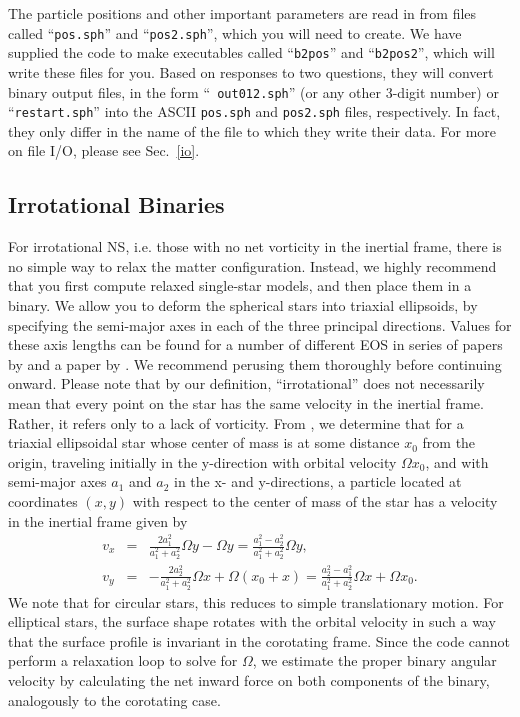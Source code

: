 The particle positions and other important parameters are read in from
files called ``{\tt pos.sph}'' and ``{\tt pos2.sph}'', 
which you will need to create.  We
have supplied the code to make executables called ``{\tt b2pos}'' and
``{\tt b2pos2}'',
which will write these files for you.  Based on responses to two
questions, they will convert binary output files, in the form ``{\tt
out012.sph}'' (or any other 3-digit number) or ``{\tt restart.sph}'' 
into the ASCII {\tt pos.sph} and {\tt pos2.sph} files, respectively.
In fact, they only differ in the name of the file to which they write
their data.  For more on file I/O, please see Sec.~\ref{io}.  

\subsection{Irrotational Binaries}
\label{in:2i}
For irrotational NS, i.e. those with no net vorticity in the inertial
frame, there is no simple way to relax the matter
configuration. Instead, we highly recommend that you first compute
relaxed single-star models, and then place them in a binary.  We allow
you to deform the spherical stars into triaxial ellipsoids, by
specifying the semi-major axes in each of the three principal
directions.  Values for these axis lengths can be found for a number
of different EOS in series of papers by \citet{LRS1,LRS2,LRS4,LRS3,LRS5} 
and a paper by \citet{LomRS2}.  
We recommend perusing them thoroughly before continuing
onward.  Please note that by our
definition, ``irrotational'' does not necessarily
mean that every point on the
star has the same velocity in the inertial frame.  Rather, it refers
only to a lack of vorticity.  From \citet{LomRS2}, we determine that for a
triaxial ellipsoidal star whose center of mass is
at some distance $x_0$ from the origin, traveling initially in
the y-direction with orbital velocity $\Omega x_0$, 
and with semi-major axes $a_1$ and $a_2$ in the x- and
y-directions, a particle located at coordinates $(x,y)$ with
respect to the center of mass of the star has a velocity in the
inertial frame given by
\begin{eqnarray}
v_x&=&\frac{2a_1^2}{a_1^2+a_2^2}\Omega y-\Omega y=
\frac{a_1^2-a_2^2}{a_1^2+a_2^2}\Omega y,\nonumber\\
v_y&=&-\frac{2a_2^2}{a_1^2+a_2^2}\Omega x+\Omega(x_0+x)=
\frac{a_2^2-a_1^2}{a_1^2+a_2^2}\Omega x+\Omega x_0.
\end{eqnarray}
We note that for circular stars, this reduces to simple translationary
motion.  For elliptical stars, the surface shape rotates with the
orbital velocity in such a way that the surface profile is invariant
in the corotating frame. Since the code cannot perform a relaxation
loop to solve for $\Omega$, we estimate the 
proper binary angular velocity by calculating the net inward force on
both components of the binary, analogously to the corotating case.  

